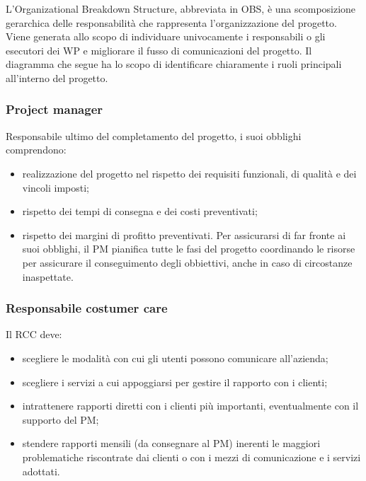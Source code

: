 L\textquoteright{}Organizational Breakdown Structure, abbreviata in OBS, \`{e} una scomposizione gerarchica delle responsabilit\`{a} che rappresenta l\textquoteright{}organizzazione del progetto. Viene generata allo scopo di individuare univocamente i responsabili o gli esecutori dei WP e migliorare il fusso di comunicazioni del progetto. Il diagramma che segue ha lo scopo di identificare chiaramente i ruoli principali all\textquoteright{}interno del progetto.

\subsubsection{Project manager}
Responsabile ultimo del completamento del progetto, i suoi obblighi comprendono:
\begin{itemize}
\item realizzazione del progetto nel rispetto dei requisiti funzionali, di qualit\`{a} e dei
vincoli imposti;
\item rispetto dei tempi di consegna e dei costi preventivati;
\item rispetto dei margini di profitto preventivati.
Per assicurarsi di far fronte ai suoi obblighi, il PM pianifica tutte le fasi del progetto
coordinando le risorse per assicurare il conseguimento degli obbiettivi, anche in caso di
circostanze inaspettate.
\end{itemize}

\subsubsection{Responsabile costumer care}
Il RCC deve:
\begin{itemize}
\item scegliere le modalit\`{a} con cui gli utenti possono comunicare all\textquoteright{}azienda;
\item scegliere i servizi a cui appoggiarsi per gestire il rapporto con i clienti;
\item intrattenere rapporti diretti con i clienti pi\`{u} importanti, eventualmente con il
supporto del PM;
\item stendere rapporti mensili (da consegnare al PM) inerenti le maggiori problematiche
riscontrate dai clienti o con i mezzi di comunicazione e i servizi adottati.
\end{itemize}

